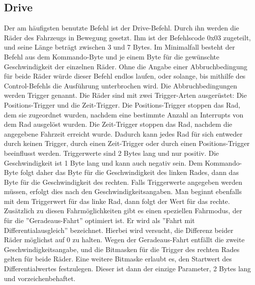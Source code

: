 \subsection{Drive}
Der am häufigsten benutzte Befehl ist der Drive-Befehl. Durch ihn werden die Räder des Fahrzeugs
in Bewegung gesetzt. Ihm ist der Befehlscode 0x03 zugeteilt, und seine Länge beträgt zwischen 3
und 7 Bytes. Im Minimalfall besteht der Befehl aus dem Kommando-Byte und je einem Byte für
die gewünschte Geschwindigkeit der einzelnen Räder. Ohne die Angabe einer Abbruchbedingung für
beide Räder würde dieser Befehl endlos laufen, oder solange, bis mithilfe des Control-Befehls
die Ausführung unterbrochen wird. Die Abbruchbedingungen werden Trigger genannt. 
Die Räder sind mit zwei Trigger-Arten ausgerüstet:
Die Positions-Trigger und die Zeit-Trigger. Die Positions-Trigger stoppen
das Rad, dem sie zugeordnet wurden, nachdem eine bestimmte Anzahl an Interrupts von dem Rad
ausgelöst wurden. Die Zeit-Trigger stoppen das Rad, nachdem die angegebene Fahrzeit erreicht
wurde. 
Dadurch kann jedes Rad für sich entweder durch keinen Trigger, durch einen Zeit-Trigger
oder durch einen Positions-Trigger beeinflusst werden.
Triggerwerte sind
2 Bytes lang und nur positiv. Die Geschwindigkeit ist 1 Byte lang und kann auch negativ sein.
Dem Kommando-Byte folgt daher das Byte für die Geschwindigkeit des linken Rades, dann
das Byte für die Geschwindigkeit des rechten. Falls Triggerwerte angegeben werden müssen,
erfolgt dies nach den Geschwindigkeitsangaben.
Man beginnt ebenfalls mit dem Triggerwert für das linke Rad, dann folgt der
Wert für das rechte.\\
Zusätzlich zu diesen Fahrmöglichkeiten gibt es einen speziellen Fahrmodus, der für
die ''Geradeaus-Fahrt'' optimiert ist. Er wird als ''Fahrt mit Differentialausgleich''
bezeichnet. Hierbei wird versucht, die Differenz beider Räder möglichst auf 0 zu
halten. Wegen der Geradeaus-Fahrt entfällt die zweite Geschwindigkeitsangabe, und 
die Bitmasken für die Trigger des rechten Rades gelten für beide Räder. Eine weitere
Bitmaske erlaubt es, den Startwert des Differentialwertes festzulegen. Dieser ist dann
der einzige Parameter, 2 Bytes lang und vorzeichenbehaftet.
